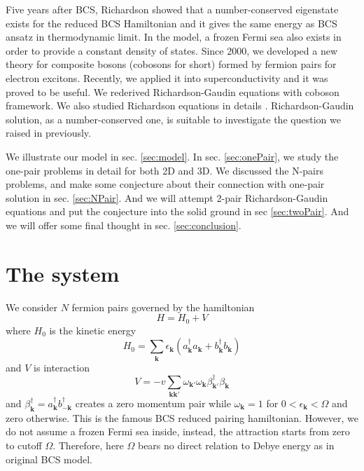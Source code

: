 \documentclass{article}
\newcommand{\vk}{\ensuremath{\mathbf{k}}}
\begin{document}
Five years after BCS, Richardson showed that a number-conserved eigenstate exists for the reduced BCS Hamiltonian and it gives the same energy as BCS ansatz in thermodynamic limit\cite{Richardson1,Richardson2,Richardson3,Richardson1968,gaudin}.  In the model, a frozen Fermi sea also exists in order to provide a constant density of states.  Since 2000, we developed a new theory for composite bosons (cobosons for short) formed by fermion pairs for electron excitons\cite{CobosonPhysicsReports}.   Recently, we applied it into superconductivity and it was proved to be useful.  We rederived Richardson-Gaudin equations with coboson framework\cite{CobosonBcsRich}. We also studied Richardson equations in details \cite{CombescotCooper,combescotBCS}.  Richardson-Gaudin solution, as a number-conserved one, is  suitable to investigate the question we raised in previously.  

We illustrate our model in sec. \ref{sec:model}.  In sec. \ref{sec:onePair}, we study the one-pair problems in detail for both 2D and 3D.  We discussed the N-pairs problems, and make some conjecture about their connection with one-pair solution  in sec. \ref{sec:NPair}.  And we will attempt 2-pair Richardson-Gaudin equations and put the conjecture into the solid ground in sec \ref{sec:twoPair}.  And we will offer some final thought in sec. \ref{sec:conclusion}.
\section{The system\label{sec:model}}
We consider $N$ fermion pairs governed by the hamiltonian
\begin{equation}
H=H_{0}+V
\end{equation}
where $H_0$ is the kinetic energy 
\begin{equation}
H_0=\sum_{\vk}\epsilon_\vk(a^\dagger_\vk{}a^{}_\vk+b^\dagger_\vk{}b^{}_\vk)
\label{eq:}
\end{equation}
and $V$ is interaction
\begin{equation}
V=-v\sum_{\vk\vk'}\omega_{\vk'}\omega_\vk\beta^\dagger_{\vk'}{}\beta^{}_\vk
\label{eq:VBcs}
\end{equation}
and $\beta^\dagger_{\vk}=a^\dagger_{\vk}b^\dagger_{-\vk}$ creates a zero momentum pair while $\omega_\vk=1$ for $0<\epsilon_\vk<\Omega$ and zero otherwise.  This is the famous BCS reduced pairing hamiltonian. However, we do not assume a frozen Fermi sea inside, instead, the attraction starts from zero to cutoff $\Omega$.  Therefore, here $\Omega$ bears no direct relation to Debye energy as in original BCS model. 
\end{document}
